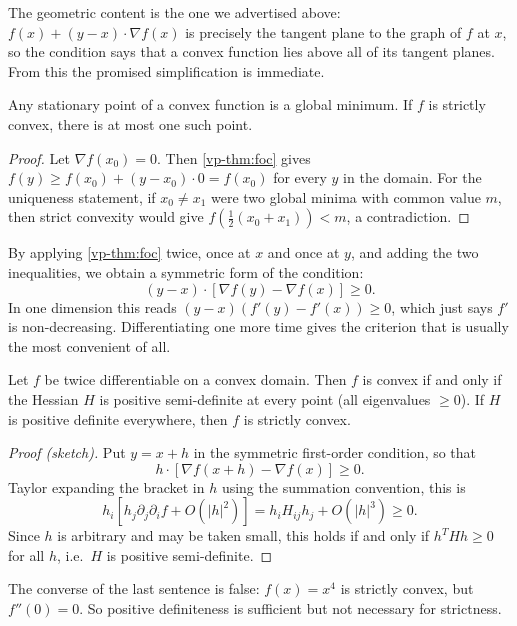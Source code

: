 \documentclass[a4paper]{scrartcl}
\begin{document}
The geometric content is the one we advertised above: $f(x) + (y - x)\cdot\nabla f(x)$ is precisely the tangent plane to the graph of $f$ at $x$, so the condition says that a convex function lies above all of its tangent planes. From this the promised simplification is immediate.

\begin{corollary}
	Any stationary point of a convex function is a global minimum. If $f$ is strictly convex, there is at most one such point.
\end{corollary}
\begin{proof}
	Let $\nabla f(x_0) = 0$. Then \autoref{vp-thm:foc} gives $f(y) \geq f(x_0) + (y - x_0)\cdot 0 = f(x_0)$ for every $y$ in the domain. For the uniqueness statement, if $x_0 \neq x_1$ were two global minima with common value $m$, then strict convexity would give $f(\frac{1}{2}(x_0 + x_1)) < m$, a contradiction.
\end{proof}

By applying \autoref{vp-thm:foc} twice, once at $x$ and once at $y$, and adding the two inequalities, we obtain a symmetric form of the condition:
$$
(y - x)\cdot\left[\nabla f(y) - \nabla f(x)\right] \geq 0.
$$
In one dimension this reads $(y-x)(f'(y) - f'(x)) \geq 0$, which just says $f'$ is non-decreasing. Differentiating one more time gives the criterion that is usually the most convenient of all.

\begin{theorem}
	Let $f$ be twice differentiable on a convex domain. Then $f$ is convex if and only if the Hessian $H$ is positive semi-definite at every point (all eigenvalues $\geq 0$). If $H$ is positive definite everywhere, then $f$ is strictly convex.
\end{theorem}
\begin{proof}[Proof (sketch)]
	Put $y = x + h$ in the symmetric first-order condition, so that
	$$
	h \cdot \left[\nabla f(x + h) - \nabla f(x)\right] \geq 0.
	$$
	Taylor expanding the bracket in $h$ using the summation convention, this is
	$$
	h_i\left[h_j \partial_j\partial_i f + O(|h|^2)\right] = h_i H_{ij}h_j + O(|h|^3) \geq 0.
	$$
	Since $h$ is arbitrary and may be taken small, this holds if and only if $h^T H h \geq 0$ for all $h$, i.e.\ $H$ is positive semi-definite.
\end{proof}

\begin{remark}
	The converse of the last sentence is false: $f(x) = x^4$ is strictly convex, but $f''(0) = 0$. So positive definiteness is sufficient but not necessary for strictness.
\end{remark}
\end{document}
